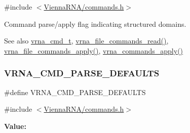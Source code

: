 {\ttfamily \#include $<$\mbox{\hyperlink{commands_8h}{Vienna\+R\+N\+A/commands.\+h}}$>$}



Command parse/apply flag indicating structured domains. 

\begin{DoxySeeAlso}{See also}
\mbox{\hyperlink{group__command__files_gaf31afe4c5f8e4bf44a670ab4c3dcd916}{vrna\+\_\+cmd\+\_\+t}}, \mbox{\hyperlink{group__command__files_gae5f56400ed43683338f7bf1c1102655a}{vrna\+\_\+file\+\_\+commands\+\_\+read()}}, \mbox{\hyperlink{group__command__files_gadbe8c9622f7bcc6dcbe3448b98df8656}{vrna\+\_\+file\+\_\+commands\+\_\+apply()}}, \mbox{\hyperlink{group__command__files_gac65d0fe86f7671a2d2b85dda1a3ddc16}{vrna\+\_\+commands\+\_\+apply()}} 
\end{DoxySeeAlso}
\mbox{\label{group__command__files_ga0a6c88e21e366dca14958d69cd024008}} 
\subsubsection{\texorpdfstring{VRNA\_CMD\_PARSE\_DEFAULTS}{VRNA\_CMD\_PARSE\_DEFAULTS}}
{\footnotesize\ttfamily \#define V\+R\+N\+A\+\_\+\+C\+M\+D\+\_\+\+P\+A\+R\+S\+E\+\_\+\+D\+E\+F\+A\+U\+L\+TS}



{\ttfamily \#include $<$\mbox{\hyperlink{commands_8h}{Vienna\+R\+N\+A/commands.\+h}}$>$}

{\bfseries Value\+:}
\begin{DoxyCode}{0}
\DoxyCodeLine{                                 )}

\end{DoxyCode}


